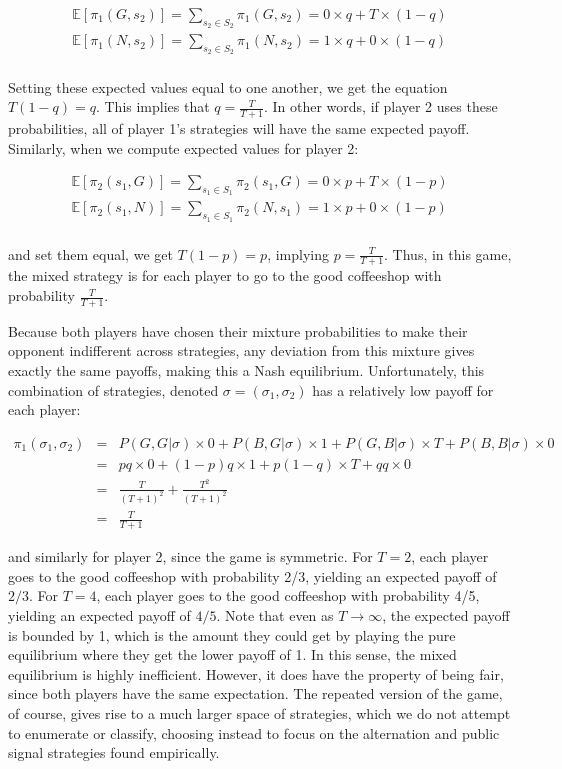 \documentclass[11pt, oneside]{article}   	%
\begin{document}
$$\begin{array}{rcl}
\mathbb{E}[\pi_1(G, s_2)] = \sum_{s_2 \in S_2} \pi_1(G, s_2) = 0\times q + T\times (1-q) \\
\mathbb{E}[\pi_1(N, s_2)] = \sum_{s_2 \in S_2} \pi_1(N, s_2) = 1\times q + 0\times (1-q) \\
\end{array}$$
	 
Setting these expected values equal to one another, we get the equation $T(1-q) = q$. This implies that $q = \frac{T}{T+1}$. In other words, if player 2 uses these probabilities, all of player 1's strategies will have the same expected payoff. Similarly, when we compute expected values for player 2: 
	 
	 $$\begin{array}{rcl}
\mathbb{E}[\pi_2(s_1, G)] = \sum_{s_1 \in S_1} \pi_2(s_1, G) = 0\times p + T\times (1-p)\\
\mathbb{E}[\pi_2(s_1, N)] = \sum_{s_1 \in S_1} \pi_2(N,s_1) = 1\times p + 0\times (1-p) \\
\end{array}$$
	 
and set them equal, we get $T(1-p) = p$, implying $p = \frac{T}{T+1}$. Thus, in this game, the mixed strategy is for each player to go to the good coffeeshop with probability $\frac{T}{T+1}$. 

Because both players have chosen their mixture probabilities to make their opponent indifferent across strategies, any deviation from this mixture gives exactly the same payoffs, making this a Nash equilibrium. Unfortunately, this combination of strategies, denoted $\sigma = (\sigma_1, \sigma_2)$ has a relatively low payoff for each player:

$$\begin{array}{rcl}
\pi_1(\sigma_1, \sigma_2) & = & P(G,G | \sigma) \times 0 + P(B,G | \sigma) \times 1 + P(G,B | \sigma) \times T + P(B,B | \sigma) \times 0 \\
& = & pq \times 0 + (1-p)q \times 1 + p(1-q)\times T + qq\times 0 \\
& = & \frac{T}{(T+1)^2} + \frac{T^2}{(T+1)^2} \\
& = & \frac{T}{T+1}\end{array}$$

and similarly for player 2, since the game is symmetric. For $T=2$, each player goes to the good coffeeshop with probability 2/3, yielding an expected payoff of $2/3$. For $T=4$, each player goes to the good coffeeshop with probability 4/5, yielding an expected payoff of $4/5$. Note that even as $T \rightarrow \infty$, the expected payoff is bounded by 1, which is the amount they could get by playing the pure equilibrium where they get the lower payoff of 1. In this sense, the mixed equilibrium is highly inefficient. However, it does have the property of being fair, since both players have the same expectation. The repeated version of the game, of course, gives rise to a much larger space of strategies, which we do not attempt to enumerate or classify, choosing instead to focus on the alternation and public signal strategies found empirically. 
\end{document}
